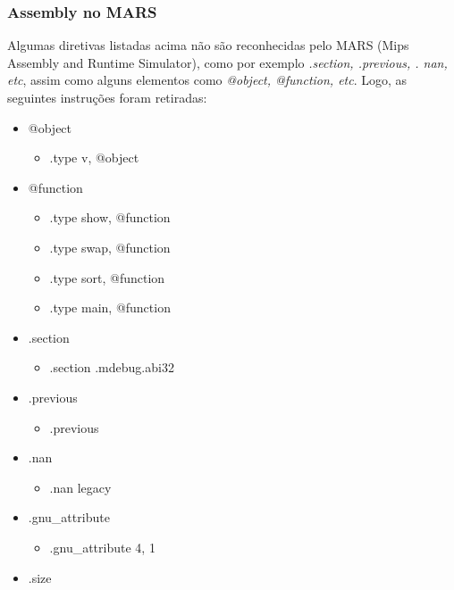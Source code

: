 \documentclass[12pt]{article}
\begin{document}
\subsubsection{Assembly no MARS}
\label{subsubsec:atomars}

Algumas diretivas listadas acima não são reconhecidas pelo MARS (Mips Assembly and Runtime Simulator), como por exemplo \textit{.section, .previous, . nan, etc}, assim como alguns elementos como \textit{@object, @function, etc}. Logo, as seguintes instruções foram retiradas:

\begin{itemize}
\item @object\\
  \begin{itemize}
  \item .type v, @object
  \end{itemize}
 \item @function\\
  \begin{itemize}
  \item .type show, @function
  \item .type swap, @function
  \item .type sort, @function
  \item .type main, @function
  \end{itemize}
\item .section\\
  \begin{itemize}
  \item .section .mdebug.abi32
  \end{itemize}
\item .previous\\
  \begin{itemize}
  \item .previous
  \end{itemize}
\item .nan\\
  \begin{itemize}
  \item .nan legacy
  \end{itemize}
\item .gnu\_attribute\\
  \begin{itemize}
  \item .gnu\_attribute 4, 1
  \end{itemize}
\item .size\\

\end{itemize}
\end{document}
